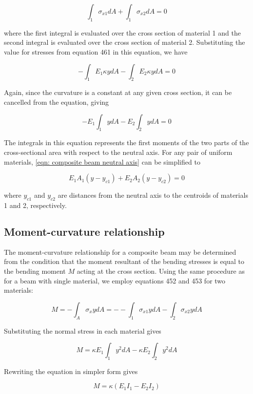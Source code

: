\documentclass[
10pt,
a4paper,
openany,
svgnames,
]{book} %
\begin{document}
\[ \int_1 \sigma_{x1}dA  + \int_1 \sigma_{x2}dA  = 0 \]

where the first integral is evaluated over the cross section of material 1 and the second integral is evaluated over the cross section of material 2. Substituting the value for stresses from equation 461 in this equation, we have

\[ - \int_1 E_1\kappa ydA  - \int_2 E_2\kappa ydA  = 0\]

Again, since the curvature is a constant at any given cross section, it can be cancelled from the equation, giving

\begin{equation} \label{eqn: composite beam neutral axis}
  -E_1\int_1 ydA  - E_2\int_2 ydA  = 0
\end{equation}

The integrals in this equation represents the first moments of the two parts of the cross-sectional area with respect to the neutral axis. For any pair of uniform materials, \cref{eqn: composite beam neutral axis} can be simplified to

\begin{equation}
  E_1A_1(y - y_{c1}) + E_2A_2(y - y_{c2}) = 0
\end{equation}

where $y_{c1}$ and $y_{c2}$ are distances from the neutral axis to the centroids of materials 1 and 2, respectively.

\subsection{Moment-curvature relationship}

The moment-curvature relationship for a composite beam may be determined from the condition that the moment resultant of the bending stresses is equal to the bending moment $M$ acting at the cross section. Using the same procedure as for a beam with single material, we employ equations 452 and 453 for two materials:

\[M =  - \int_A \sigma _xydA  =  -  - \int_1 \sigma _{x1}ydA  - \int_2 \sigma _{x2}ydA \]

Substituting the normal stress in each material gives

\[M = \kappa E_1\int_1 y^2dA  - \kappa E_2\int_2 y^2dA \]

Rewriting the equation in simpler form gives

\begin{equation}
  M = \kappa (E_1I_1 - E_2I_2)
\end{equation}
\end{document}
